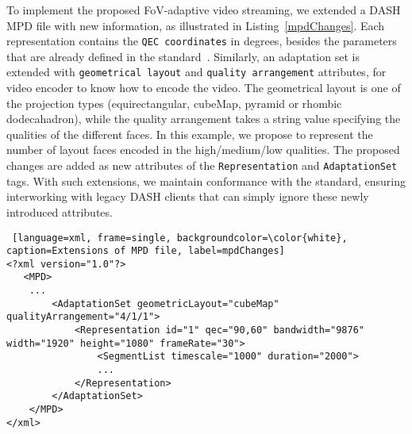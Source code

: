  To implement the proposed
FoV-adaptive video streaming, we extended a DASH \ac{MPD} file with
new information, as illustrated in Listing~\ref{mpdChanges}. Each
representation contains the \texttt{QEC coordinates} in degrees,
besides the parameters that are already defined in the
standard~\cite{iso_iec}. Similarly, an adaptation set is extended with
\texttt{geometrical layout} and \texttt{quality arrangement}
attributes, for video encoder to know how to encode the video. The
geometrical layout is one of the projection types (equirectangular,
cubeMap, pyramid or rhombic dodecahadron), while the quality
arrangement takes a string value specifying the qualities of the
different faces. In this example, we propose to represent the number
of layout faces encoded in the high/medium/low qualities. The proposed
changes are added as new attributes of the \texttt{Representation} and
\texttt{AdaptationSet} tags. With such extensions, we maintain
conformance with the standard, ensuring interworking with legacy DASH
clients that can simply ignore these newly introduced attributes.

\begin {lstlisting} [language=xml, frame=single, backgroundcolor=\color{white}, caption=Extensions of MPD file, label=mpdChanges]
<?xml version="1.0"?>
   <MPD>
    ...
        <AdaptationSet geometricLayout="cubeMap" qualityArrangement="4/1/1">
            <Representation id="1" qec="90,60" bandwidth="9876" width="1920" height="1080" frameRate="30">
                <SegmentList timescale="1000" duration="2000">
                ...
            </Representation>
        </AdaptationSet>
    </MPD>
</xml>
\end{lstlisting}




